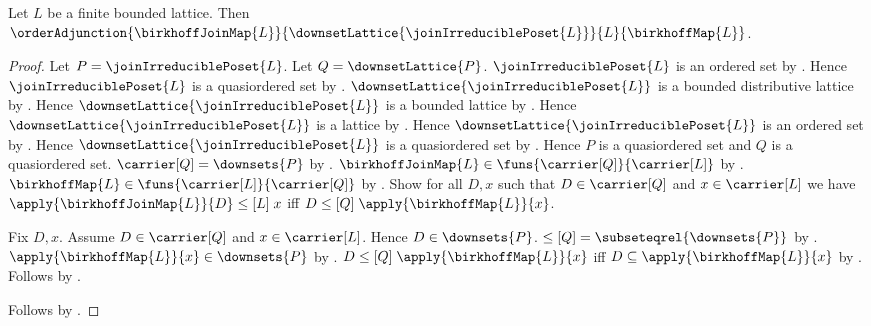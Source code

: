 \begin{theorem}\label{finite_birkhoff_order_adjunction}
    Let $L$ be a finite bounded lattice.
    Then
        $\orderAdjunction
            {\birkhoffJoinMap{L}}
            {\downsetLattice{\joinIrreduciblePoset{L}}}
            {L}
            {\birkhoffMap{L}}$.
\end{theorem}
\begin{proof}
    Let $P=\joinIrreduciblePoset{L}$.
    Let $Q=\downsetLattice{P}$.
    $\joinIrreduciblePoset{L}$ is an ordered set by
        .
    Hence $\joinIrreduciblePoset{L}$ is a quasiordered set by
        .
    $\downsetLattice{\joinIrreduciblePoset{L}}$ is a bounded
        distributive lattice by
        .
    Hence $\downsetLattice{\joinIrreduciblePoset{L}}$ is a bounded
        lattice by
        .
    Hence $\downsetLattice{\joinIrreduciblePoset{L}}$ is a lattice by
        .
    Hence $\downsetLattice{\joinIrreduciblePoset{L}}$ is an ordered
        set by .
    Hence $\downsetLattice{\joinIrreduciblePoset{L}}$ is a
        quasiordered set by .
    Hence $P$ is a quasiordered set and $Q$ is a quasiordered set.
    $\carrier[Q]=\downsets{P}$ by
        .
    $\birkhoffJoinMap{L}\in\funs{\carrier[Q]}{\carrier[L]}$ by
        .
    $\birkhoffMap{L}\in\funs{\carrier[L]}{\carrier[Q]}$ by
        .
    Show for all $D,x$ such that $D\in\carrier[Q]$ and
        $x\in\carrier[L]$ we have
        $\apply{\birkhoffJoinMap{L}}{D}\mathrel{\leq[L]}x$ iff
        $D\mathrel{\leq[Q]}\apply{\birkhoffMap{L}}{x}$.
    \begin{subproof}
        Fix $D,x$.
        Assume $D\in\carrier[Q]$ and $x\in\carrier[L]$.
        Hence $D\in\downsets{P}$.
        $\leq[Q]=\subseteqrel{\downsets{P}}$ by
            .
        $\apply{\birkhoffMap{L}}{x}\in\downsets{P}$ by
            .
        $D\mathrel{\leq[Q]}\apply{\birkhoffMap{L}}{x}$ iff
            $D\subseteq\apply{\birkhoffMap{L}}{x}$ by
            .
        Follows by .
    \end{subproof}
    Follows by .
\end{proof}

